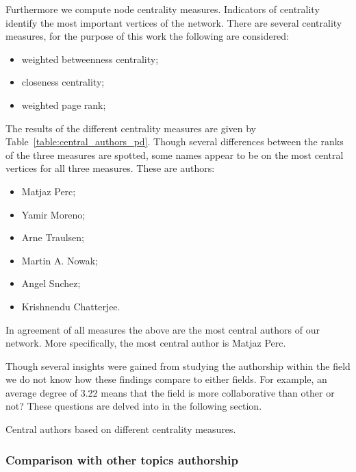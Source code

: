 \documentclass{article}
\begin{document}
Furthermore we compute node centrality measures. Indicators of centrality 
identify the most important vertices of the network. There are several centrality
measures, for the purpose of this work the following are considered:

\begin{itemize}
    \item weighted betweenness centrality;
    \item closeness centrality;
    \item weighted page rank;
\end{itemize}

The results of the different centrality measures are given by Table~\ref{table:central_authors_pd}.
Though several differences between the ranks of the three measures are spotted,
some names appear to be on the most central vertices for all three measures.
These are authors:

\begin{itemize}
    \item Matjaz Perc;
    \item Yamir Moreno;
    \item Arne Traulsen;
    \item Martin A. Nowak;
    \item Angel Snchez;
    \item Krishnendu Chatterjee.
\end{itemize}

In agreement of all measures the above are the most central authors of our network.
More specifically, the most central author is Matjaz Perc.

Though several insights were gained from studying the authorship within the field
we do not know how these findings compare to either fields. For example, an 
average degree of 3.22 means that the field is more collaborative than other or not?
These questions are delved into in the following section.

\begin{table}[!hbtp]
    \begin{center}
    \scalebox{0.8}{
    
    
    }
    \caption{Central authors based on different centrality measures.}
    \label{table:central_authors_pd}
    \end{center}
\end{table}

\subsubsection{Comparison with other topics authorship}
\end{document}

